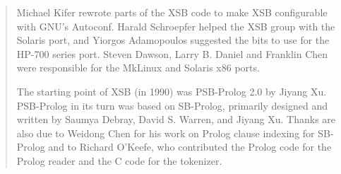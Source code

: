 \begin{quote}
Michael Kifer rewrote parts of the XSB code to make XSB configurable
with GNU's Autoconf.  Harald Schroepfer helped the XSB group with the
Solaris port, and Yiorgos Adamopoulos suggested the bits to use for
the HP-700 series port.  Steven Dawson, Larry B. Daniel and Franklin
Chen were responsible for the MkLinux and Solaris x86 ports.

The starting point of XSB (in 1990) was PSB-Prolog 2.0 by Jiyang Xu.
PSB-Prolog in its turn was based on SB-Prolog, primarily designed and
written by Saumya Debray, David S. Warren, and Jiyang Xu.  Thanks are
also due to Weidong Chen for his work on Prolog clause indexing for
SB-Prolog and to Richard O'Keefe, who contributed the Prolog code for
the Prolog reader and the C code for the tokenizer.  

\end{quote}

